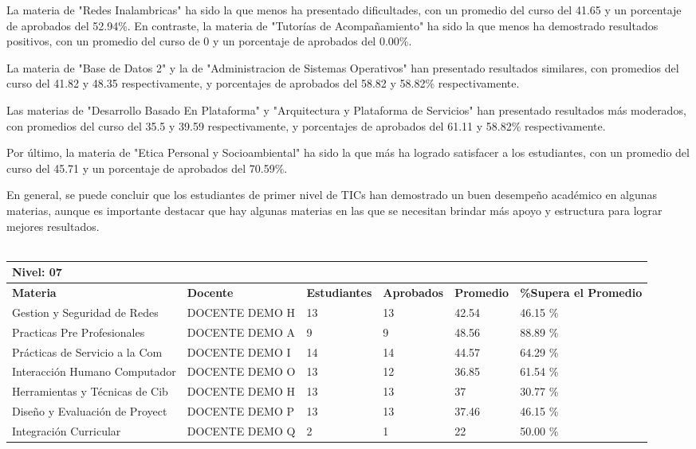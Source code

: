 La materia de "Redes Inalambricas" ha sido la que menos ha presentado dificultades, con un promedio del curso del 41.65 y un porcentaje de aprobados del 52.94\%. En contraste, la materia de "Tutorías de Acompañamiento" ha sido la que menos ha demostrado resultados positivos, con un promedio del curso de 0 y un porcentaje de aprobados del 0.00\%.

La materia de "Base de Datos 2" y la de "Administracion de Sistemas Operativos" han presentado resultados similares, con promedios del curso del 41.82 y 48.35 respectivamente, y porcentajes de aprobados del 58.82 y 58.82\% respectivamente.

Las materias de "Desarrollo Basado En Plataforma" y "Arquitectura y Plataforma de Servicios" han presentado resultados más moderados, con promedios del curso del 35.5 y 39.59 respectivamente, y porcentajes de aprobados del 61.11 y 58.82\% respectivamente.

Por último, la materia de "Etica Personal y Socioambiental" ha sido la que más ha logrado satisfacer a los estudiantes, con un promedio del curso del 45.71 y un porcentaje de aprobados del 70.59\%.

En general, se puede concluir que los estudiantes de primer nivel de TICs han demostrado un buen desempeño académico en algunas materias, aunque es importante destacar que hay algunas materias en las que se necesitan brindar más apoyo y estructura para lograr mejores resultados.\\
\vspace{1cm}\\\small
\begin{tabularx}{\textwidth}{|p{2.5cm}|p{2.5cm}|X|X|X|X|}
\hline
\multicolumn{6}{|X|}{\textbf{Nivel: 07 }}\\\hline\textbf{Materia} & \textbf{Docente} & \textbf{Estudiantes} & \textbf{Aprobados} & \textbf{Promedio} & \textbf{\%Supera el Promedio} \\ \hline
Gestion y Seguridad de Redes & DOCENTE DEMO H & 13 & 13 & 42.54 & 46.15 \%\\ \hline
Practicas Pre Profesionales & DOCENTE DEMO A & 9 & 9 & 48.56 & 88.89 \%\\ \hline
Prácticas de Servicio a la Com & DOCENTE DEMO I & 14 & 14 & 44.57 & 64.29 \%\\ \hline
Interacción Humano Computador & DOCENTE DEMO O & 13 & 12 & 36.85 & 61.54 \%\\ \hline
Herramientas y Técnicas de Cib & DOCENTE DEMO H & 13 & 13 & 37 & 30.77 \%\\ \hline
Diseño y Evaluación de Proyect & DOCENTE DEMO P & 13 & 13 & 37.46 & 46.15 \%\\ \hline
Integración Curricular & DOCENTE DEMO Q & 2 & 1 & 22 & 50.00 \%\\ \hline
\end{tabularx}

